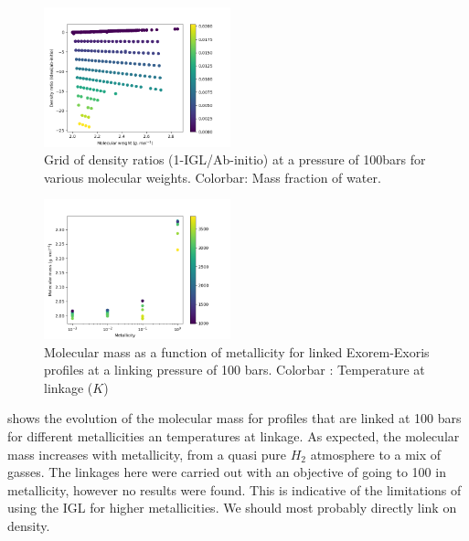 \begin{figure}
    \centering
    \includegraphics[width=0.48\textwidth]{Images/EOS_comparaison_grid.png}
    \caption{Grid of density ratios (1-IGL/Ab-initio) at a pressure of 100bars for various molecular weights. Colorbar: Mass fraction of water.}
    \label{fig:EOS_comp_grid}
\end{figure}

\begin{figure}
    \centering
    \includegraphics[width=0.48\textwidth]{Images/MM_Met.png}
    \caption{Molecular mass as a function of metallicity for linked Exorem-Exoris profiles at a linking pressure of 100 bars. Colorbar : Temperature at linkage ($K$)}
    \label{fig:MM_Met}
\end{figure}

 shows the evolution of the molecular mass for profiles that are linked at 100 bars for different metallicities an temperatures at linkage. As expected, the molecular mass increases with metallicity, from a quasi pure $H_2$ atmosphere to a mix of gasses. The linkages here were carried out with an objective of going to 100 in metallicity, however no results were found. This is indicative of the limitations of using the IGL for higher metallicities. We should most probably directly link on density.